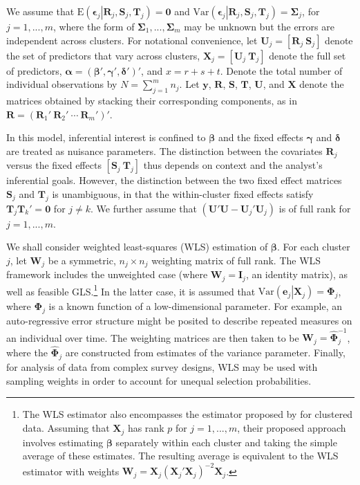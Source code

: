 \documentclass[12pt]{article}\usepackage[]{graphicx}\usepackage[]{color}
\newcommand{\E}{\text{E}}
\newcommand{\Var}{\text{Var}}
\newcommand{\bm}{\mathbf}
\newcommand{\bs}{\boldsymbol}
\begin{document}
We assume that $\E\left(\bs\epsilon_j\left|\bm{R}_j,\bm{S}_j, \bm{T}_j\right.\right) = \bm{0}$ and $\Var\left(\bs\epsilon_j\left|\bm{R}_j,\bm{S}_j,\bm{T}_j\right.\right) = \bs\Sigma_j$, for $j = 1,...,m$, where the form of $\bs\Sigma_1,...,\bs\Sigma_m$ may be unknown but the errors are independent across clusters. 
For notational convenience, let $\bm{U}_j = \left[\bm{R}_j \ \bm{S}_j \right]$ denote the set of predictors that vary across clusters, $\bm{X}_j = \left[\bm{U}_j \ \bm{T}_j \right]$ denote the full set of predictors, $\bs\alpha = \left(\bs\beta', \bs\gamma', \bs\delta' \right)'$, and $x = r + s + t$.
Denote the total number of individual observations by $N = \sum_{j=1}^m n_j$.
Let $\bm{y}$, $\bm{R}$, $\bm{S}$, $\bm{T}$, $\bm{U}$, and $\bm{X}$ denote the matrices obtained by stacking their corresponding components, as in $\bm{R} = \left(\bm{R}_1' \ \bm{R}_2' \ \cdots \ \bm{R}_m'\right)'$. 

In this model, inferential interest is confined to $\bs\beta$ and the fixed effects $\bs\gamma$ and $\bs\delta$ are treated as nuisance parameters. The distinction between the covariates $\bm{R}_j$ versus the fixed effects $\left[\bm{S}_j \ \bm{T}_j\right]$ thus depends on context and the analyst's inferential goals. However, the distinction between the two fixed effect matrices $\bm{S}_j$ and $\bm{T}_j$ is unambiguous, in that the within-cluster fixed effects satisfy $\bm{T}_j \bm{T}_k' = \bm{0}$ for $j \neq k$. We further assume that $\left(\bm{U}'\bm{U} - \bm{U}_j'\bm{U}_j\right)$ is of full rank for $j = 1,...,m$.

We shall consider weighted least-squares (WLS) estimation of $\bs\beta$. 
For each cluster $j$, let $\bm{W}_j$ be a symmetric, $n_j \times n_j$ weighting matrix of full rank. 
The WLS framework includes the unweighted case (where $\bm{W}_j = \bm{I}_j$, an identity matrix), as well as feasible GLS.\footnote{
The WLS estimator also encompasses the estimator proposed by \citet{Ibragimov2010tstatistic} for clustered data. 
Assuming that $\bm{X}_j$ has rank $p$ for $j = 1,...,m$, their proposed approach involves estimating $\bs\beta$ separately within each cluster and taking the simple average of these estimates. 
The resulting average is equivalent to the WLS estimator with weights $\bm{W}_j = \bm{X}_j \left(\bm{X}_j'\bm{X}_j\right)^{-2} \bm{X}_j$.} 
In the latter case, it is assumed that $\Var\left(\bm{e}_j\left|\bm{X}_j\right.\right) = \bs\Phi_j$, where $\bs\Phi_j$ is a known function of a low-dimensional parameter. 
For example, an auto-regressive error structure might be posited to describe repeated measures on an individual over time. 
The weighting matrices are then taken to be $\bm{W}_j = \hat{\bs\Phi}_j^{-1}$, where the $\hat{\bs\Phi}_j$ are constructed from estimates of the variance parameter.
Finally, for analysis of data from complex survey designs, WLS may be used with sampling weights in order to account for unequal selection probabilities.
\end{document}
